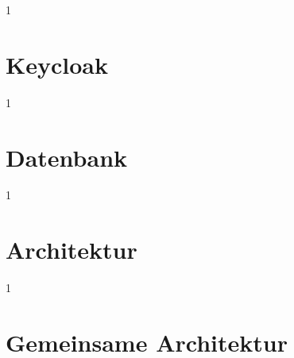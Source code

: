 \documentclass[12pt,a4paper,titlepage,listof=totoc,bibliography=totoc,chapteratlists=0pt]{scrreprt}
\begin{document}
\begin{spacing}{1}
\chapter{Keycloak}\label{chapter:keycloak}  %
\end{spacing}


\begin{spacing}{1}
\chapter{Datenbank}\label{chapter:datenbank}
\end{spacing}


\begin{spacing}{1}
\chapter{Architektur}\label{chapter:architektur}  %
\end{spacing}


\begin{spacing}{1}
\chapter{Gemeinsame Architektur}\label{chapter:connectedArchitecture}  %
\end{spacing}


\newpage
{}
\setcounter{page}{\value{RPages}}

\glsnogroupskiptrue
{}
{
    \printglossary[title=Glossar,toctitle=Glossar]
}
{
    \printglossary[title=Glossary,toctitle=Glossary]
}
\listoffigures
\listoftables
\lstlistoflistings
\appendix
{}

\end{document}
